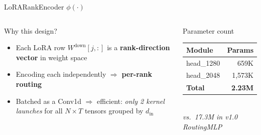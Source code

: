 \documentclass[aspectratio=169,10pt]{beamer}
\begin{document}
\begin{frame}[shrink=20]{LoRARankEncoder $\phi(\cdot)$}
\begin{columns}[T]
      \begin{block}{Why this design?}
        \begin{itemize}
          \item Each LoRA row $W^\text{down}[j,:]$ is a \textbf{rank-direction vector} in weight space
          \item Encoding each independently $\Rightarrow$ \textbf{per-rank routing}
          \item Batched as a Conv1d $\Rightarrow$ efficient: \emph{only 2 kernel launches} for all $N\!\times\! T$ tensors grouped by $d_\text{in}$
        \end{itemize}
      \end{block}
      \vspace{0.4em}
      \begin{exampleblock}{Parameter count}
        \begin{tabular}{lr}
          \toprule
          Module & Params \\
          \midrule
          head\_1280 & 659K \\
          head\_2048 & 1,573K \\
          \midrule
          \textbf{Total} & \textbf{2.23M} \\
          \bottomrule
        \end{tabular}
        \vspace{0.2em}\\
        \small \textit{vs.\ 17.3M in v1.0 RoutingMLP}
      \end{exampleblock}
  \end{columns}
\end{frame}
\end{document}

